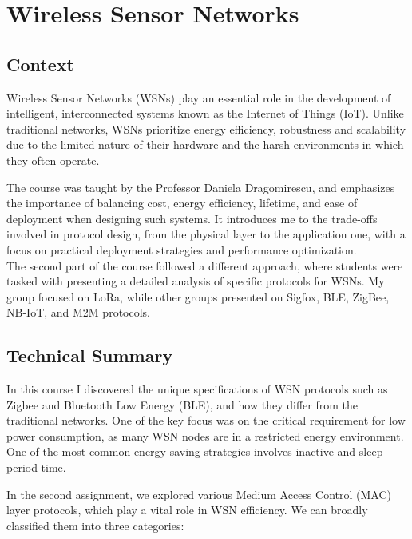 \section{Wireless Sensor Networks}
\subsection{Context}
\indent \indent Wireless Sensor Networks (WSNs) play an essential role in the development of intelligent, interconnected systems known as the Internet of Things (IoT). Unlike traditional networks, WSNs prioritize energy efficiency, robustness and scalability due to the limited nature of their hardware and the harsh environments in which they often operate.
\vspace{0.25cm}

The course was taught by the Professor Daniela Dragomirescu, and emphasizes the importance of balancing cost, energy efficiency, lifetime, and ease of deployment when designing such systems. It introduces me to the trade-offs involved in protocol design, from the physical layer to the application one, with a focus on practical deployment strategies and performance optimization.
\\
The second part of the course followed a different approach, where students were tasked with presenting a detailed analysis of specific protocols for WSNs. My group focused on LoRa, while other groups presented on Sigfox, BLE, ZigBee, NB-IoT, and M2M protocols.

\subsection{Technical Summary}  

\indent \indent In this course I discovered the unique specifications of WSN protocols such as Zigbee and Bluetooth Low Energy (BLE), and how they differ from the traditional networks.  One of the key focus was on the critical requirement for low power consumption, as many WSN nodes are in a restricted energy environment. One of the most common energy-saving strategies involves inactive and sleep period time.
\vspace{0.25cm}

\noindent In the second assignment, we explored various Medium Access Control (MAC) layer protocols, which play a vital role in WSN efficiency. We can  broadly classified them into three categories:

